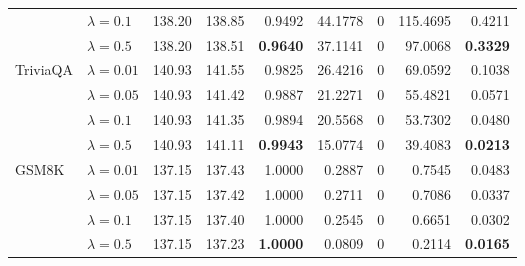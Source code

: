 \begin{table}[t]
{\begin{tabular}{l l rrrrrrr}
 & $\lambda{=}0.1$ & 138.20 & 138.85 & \cellcolor{red!18} 0.9492 & \cellcolor{red!18} 44.1778 & \cellcolor{cyan!12} $0$ & \cellcolor{red!18} 115.4695 & \cellcolor{red!18} 0.4211 \\
 & $\lambda{=}0.5$ & 138.20 & 138.51 & \textbf{0.9640} & 37.1141 & \cellcolor{cyan!12} $0$ & 97.0068 & \textbf{0.3329} \\
\midrule
TriviaQA & $\lambda{=}0.01$ & 140.93 & 141.55 & 0.9825 & 26.4216 & \cellcolor{cyan!12} $0$ & 69.0592 & 0.1038 \\
 & $\lambda{=}0.05$ & 140.93 & 141.42 & 0.9887 & 21.2271 & \cellcolor{cyan!12} $0$ & 55.4821 & 0.0571 \\
 & $\lambda{=}0.1$ & 140.93 & 141.35 & 0.9894 & 20.5568 & \cellcolor{cyan!12} $0$ & 53.7302 & 0.0480 \\
 & $\lambda{=}0.5$ & 140.93 & 141.11 & \textbf{0.9943} & 15.0774 & \cellcolor{cyan!12} $0$ & 39.4083 & \textbf{0.0213} \\
\midrule
GSM8K & $\lambda{=}0.01$ & 137.15 & 137.43 & 1.0000 & 0.2887 & \cellcolor{cyan!12} $0$ & 0.7545 & 0.0483 \\
 & $\lambda{=}0.05$ & 137.15 & 137.42 & 1.0000 & 0.2711 & \cellcolor{cyan!12} $0$ & 0.7086 & 0.0337 \\
 & $\lambda{=}0.1$ & 137.15 & 137.40 & 1.0000 & 0.2545 & \cellcolor{cyan!12} $0$ & 0.6651 & 0.0302 \\
 & $\lambda{=}0.5$ & 137.15 & 137.23 & \textbf{1.0000} & 0.0809 & \cellcolor{cyan!12} $0$ & 0.2114 & \textbf{0.0165} \\
\bottomrule
\end{tabular}}
\end{table}